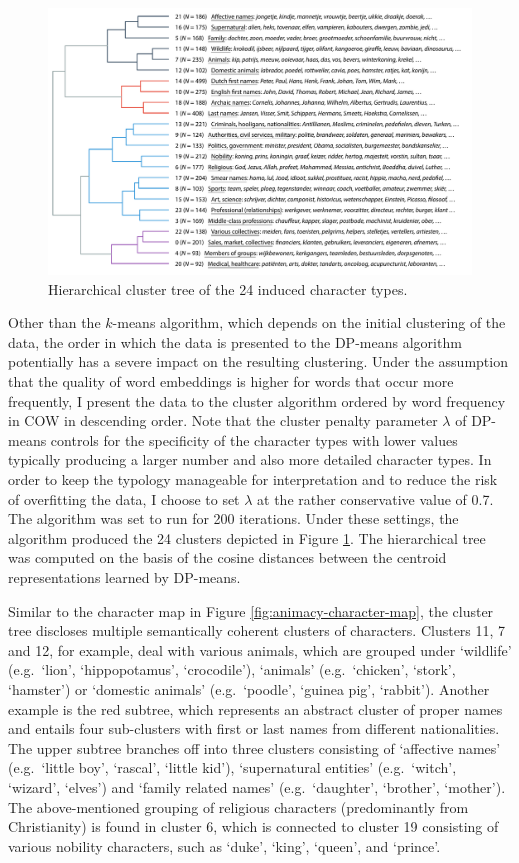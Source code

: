 \begin{figure}
\centering
\includegraphics[width=\textwidth]{images/character-tree.pdf}
\caption{Hierarchical cluster tree of the 24 induced character types.}
\label{fig:animacy-cluster-map}
\end{figure}

Other than the $k$-means algorithm, which depends on the initial clustering of the data, the order in which the data is presented to the DP-means algorithm potentially has a severe impact on the resulting clustering. Under the assumption that the quality of word embeddings is higher for words that occur more frequently, I present the data to the cluster algorithm ordered by word frequency in COW in descending order. Note that the cluster penalty parameter $\lambda$ of DP-means controls for the specificity of the character types with lower values typically producing a larger number and also more detailed character types. In order to keep the typology manageable for interpretation and to reduce the risk of overfitting the data, I choose to set $\lambda$ at the rather conservative value of 0.7. The algorithm was set to run for 200 iterations. Under these settings, the algorithm produced the 24 clusters depicted in Figure \ref{fig:animacy-cluster-map}. The hierarchical tree was computed on the basis of the cosine distances between the centroid representations learned by DP-means.

Similar to the character map in Figure \ref{fig:animacy-character-map}, the cluster tree discloses multiple semantically coherent clusters of characters. Clusters 11, 7 and 12, for example, deal with various animals, which are grouped under `wildlife' (e.g.\ `lion', `hippopotamus', `crocodile'), `animals' (e.g.\ `chicken', `stork', `hamster') or `domestic animals' (e.g.\ `poodle', `guinea pig', `rabbit'). Another example is the red subtree, which represents an abstract cluster of proper names and entails four sub-clusters with first or last names from different nationalities. The upper subtree branches off into three clusters consisting of `affective names' (e.g.\ `little boy', `rascal', `little kid'), `supernatural entities' (e.g.\ `witch', `wizard', `elves') and `family related names' (e.g.\ `daughter', `brother', `mother'). The above-mentioned grouping of religious characters (predominantly from Christianity) is found in cluster 6, which is connected to cluster 19 consisting of various nobility characters, such as `duke', `king', `queen', and `prince'. 


